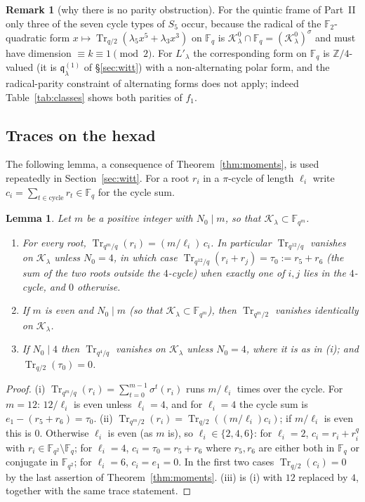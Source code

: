 \documentclass[12pt,a4paper]{amsart}
\newtheorem{lemma}[theorem]{Lemma}
\theoremstyle{definition}
\newtheorem{remark}[theorem]{Remark}
\newcommand{\F}{\mathbb{F}}
\newcommand{\Z}{\mathbb{Z}}
\newcommand{\Tr}{\operatorname{Tr}}
\newcommand{\Kk}{\mathcal{K}}
\newcommand{\qq}{\mathfrak{q}}
\begin{document}
\begin{remark}[why there is no parity obstruction]
For the quintic frame of Part~II only three of the seven cycle types of $S_5$ occur, because the radical of the $\F_2$-quadratic form $x\mapsto\Tr_{q/2}(\lambda_5x^5+\lambda_3x^3)$ on $\F_q$ is $\Kk^0_\lambda\cap\F_q=(\Kk^0_\lambda)^\sigma$ and must have dimension $\equiv k\equiv1\pmod 2$. For $L'_\lambda$ the corresponding form on $\F_q$ is $\Z/4$-valued (it is $\qq^{(1)}_\lambda$ of \S\ref{sec:witt}) with a non-alternating polar form, and the radical-parity constraint of alternating forms does not apply; indeed Table~\ref{tab:classes} shows both parities of $f_1$.
\end{remark}

\subsection{Traces on the hexad}
The following lemma, a consequence of Theorem~\ref{thm:moments}, is used repeatedly in Section~\ref{sec:witt}. For a root $r_i$ in a $\pi$-cycle of length $\ell_i$ write $c_i=\sum_{t\in\text{cycle}}r_t\in\F_q$ for the cycle sum.

\begin{lemma}\label{lem:traces}
Let $m$ be a positive integer with $N_0\mid m$, so that $\Kk_\lambda\subset\F_{q^m}$.
\begin{enumerate}[label=\textup{(\roman*)},leftmargin=2em]
\item For every root, $\Tr_{q^m/q}(r_i)=(m/\ell_i)\,c_i$. In particular $\Tr_{q^{12}/q}$ vanishes on $\Kk_\lambda$ unless $N_0=4$, in which case $\Tr_{q^{12}/q}(r_i+r_j)=\tau_0:=r_5+r_6$ (the sum of the two roots outside the $4$-cycle) when exactly one of $i,j$ lies in the $4$-cycle, and $0$ otherwise.
\item If $m$ is even and $N_0\mid m$ (so that $\Kk_\lambda\subset\F_{q^m}$), then $\Tr_{q^m/2}$ vanishes identically on $\Kk_\lambda$.
\item If $N_0\mid4$ then $\Tr_{q^4/q}$ vanishes on $\Kk_\lambda$ unless $N_0=4$, where it is as in \textup{(i)}; and $\Tr_{q/2}(\tau_0)=0$.
\end{enumerate}
\end{lemma}
\begin{proof}
(i) $\Tr_{q^m/q}(r_i)=\sum_{t=0}^{m-1}\sigma^t(r_i)$ runs $m/\ell_i$ times over the cycle. For $m=12$: $12/\ell_i$ is even unless $\ell_i=4$, and for $\ell_i=4$ the cycle sum is $e_1-(r_5+r_6)=\tau_0$. (ii) $\Tr_{q^m/2}(r_i)=\Tr_{q/2}((m/\ell_i)c_i)$; if $m/\ell_i$ is even this is $0$. Otherwise $\ell_i$ is even (as $m$ is), so $\ell_i\in\{2,4,6\}$: for $\ell_i=2$, $c_i=r_i+r_i^q$ with $r_i\in\F_{q^2}\setminus\F_q$; for $\ell_i=4$, $c_i=\tau_0=r_5+r_6$ where $r_5,r_6$ are either both in $\F_q$ or conjugate in $\F_{q^2}$; for $\ell_i=6$, $c_i=e_1=0$. In the first two cases $\Tr_{q/2}(c_i)=0$ by the last assertion of Theorem~\ref{thm:moments}. (iii) is (i) with $12$ replaced by $4$, together with the same trace statement.
\end{proof}
\end{document}
